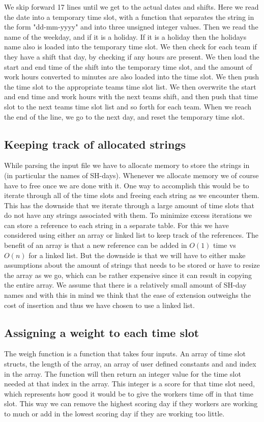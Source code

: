 We skip forward 17 lines until we get to the actual dates and shifts. Here we read the date into a temporary time slot, with a function that separates the string in the form "dd-mm-yyyy" and into three unsigned integer values. Then we read the name of the weekday, and if it is a holiday. If it is a holiday then the holidays name also is loaded into the temporary time slot. We then check for each team if they have a shift that day, by checking if any hours are present. We then load the start and end time of the shift into the temporary time slot, and the amount of work hours converted to minutes are also loaded into the time slot. We then push the time slot to the appropriate teams time slot list. We then overwrite the start and end time and work hours with the next teams shift, and then push that time slot to the next teams time slot list and so forth for each team. When we reach the end of the line, we go to the next day, and reset the temporary time slot. 

\subsection{Keeping track of allocated strings}
While parsing the input file we have to allocate memory to store the strings in (in particular the names of SH-days). Whenever we allocate memory we of course have to free once we are done with it. One way to accomplish this would be to iterate through all of the time slots and freeing each string as we encounter them. This has the downside that we iterate through a large amount of time slots that do not have any strings associated with them. To minimize excess iterations we can store a reference to each string in a separate table. For this we have considered using either an  array or linked list to keep track of the references. The benefit of an array is that a new reference can be added in $O(1)$ time vs $O(n)$ for a linked list. But the downside is that we will have to either make assumptions about the amount of strings that needs to be stored or have to resize the array as we go, which can be rather expensive since it can result in copying the entire array. We assume that there is a relatively small amount of SH-day names and with this in mind we think that the ease of extension outweighs the cost of insertion and thus we have chosen to use a linked list.

\subsection{Assigning a weight to each time slot}
The weigh function is a function that takes four inputs. An array of time slot structs, the length of the array, an array of user defined constants and and index in the array. The function will then return an integer value for the time slot needed at that index in the array. This integer is a score for that time slot need, which represents how good it would be to give the workers time off in that time slot. This way we can remove the highest scoring day if they workers are working to much or add in the lowest scoring day if they are working too little. 

